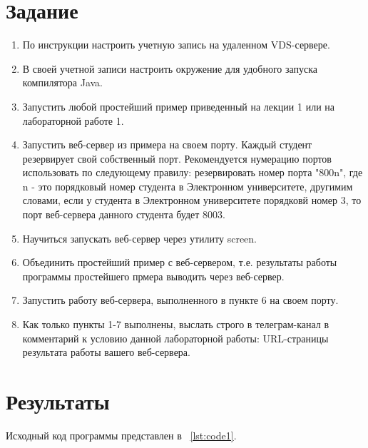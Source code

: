 \documentclass[a4paper, 14pt]{extarticle}
\begin{document}
\renewcommand{\ttdefault}{pcr}

\setlength{\tabcolsep}{3pt}
\newpage
\setcounter{page}{2}

\section{Задание}\label{Sect::task}
\begin{enumerate}
\item По инструкции настроить учетную запись на удаленном VDS-сервере.
\item В своей учетной записи настроить окружение для удобного запуска компилятора Java.
\item Запустить любой простейший пример приведенный на лекции 1 или на лабораторной работе 1.
\item Запустить веб-сервер из примера на своем порту. Каждый студент резервирует свой собственный порт. Рекомендуется нумерацию портов использовать по следующему правилу: резервировать номер порта "800n", где n - это порядковый номер студента в Электронном университете, другимим словами, если у студента в Электронном университете порядковй номер 3, то порт веб-сервера данного студента будет 8003.
\item Научиться запускать веб-сервер через утилиту screen.
\item Объединить простейший пример с веб-сервером, т.е. результаты работы программы простейшего прмера выводить через веб-сервер.
\item Запустить работу веб-сервера, выполненного в пункте 6 на своем порту.
\item Как только пункты 1-7 выполнены, выслать строго в телеграм-канал в комментарий к условию данной лабораторной работы: URL-страницы результата работы вашего веб-сервера.
\end{enumerate}
\section{Результаты}\label{Sect::res}

Исходный код программы представлен в ~\ref{lst:code1}.
\end{document}
